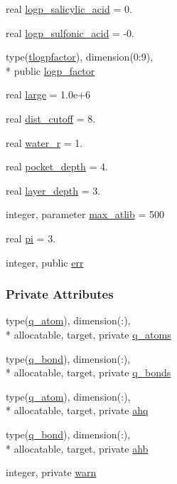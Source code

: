 \begin{DoxyCompactItemize}
\item 
real \hyperlink{classcalc__xscore_a833567713752399cd4b2caeea9efcaf8}{logp\-\_\-salicylic\-\_\-acid} = 0.
\item 
real \hyperlink{classcalc__xscore_a061c7d7389e7c0cf2b5850ab7fc5c934}{logp\-\_\-sulfonic\-\_\-acid} = -\/0.
\item 
type(\hyperlink{structcalc__xscore_1_1tlogpfactor}{tlogpfactor}), dimension(0\-:9), \\*
public \hyperlink{classcalc__xscore_a15e10912826f48cd33ca1d0c8117ce28}{logp\-\_\-factor}
\item 
real \hyperlink{classcalc__xscore_aed23f3f4cf5a66da5996c92f0068b4bd}{large} = 1.\-0e+6
\item 
real \hyperlink{classcalc__xscore_a93430b9e9b8412c72c0c348f44b0ad99}{dist\-\_\-cutoff} = 8.
\item 
real \hyperlink{classcalc__xscore_a73be5046b1f659dd3ef02d0a3a8f1f6a}{water\-\_\-r} = 1.
\item 
real \hyperlink{classcalc__xscore_af609b9596ea420562a73357a122f5469}{pocket\-\_\-depth} = 4.
\item 
real \hyperlink{classcalc__xscore_acf719e7fa91a401a1c8044e68fbf9697}{layer\-\_\-depth} = 3.
\item 
integer, parameter \hyperlink{classcalc__xscore_a91527e259ea15022ad9b4c4621744ad7}{max\-\_\-atlib} = 500
\item 
real \hyperlink{classcalc__xscore_a4fab50dc764bf59bedef759a3a262de1}{pi} = 3.
\item 
integer, public \hyperlink{classcalc__xscore_ab17f107731825ab90d865fb522944051}{err}
\end{DoxyCompactItemize}
\subsubsection*{Private Attributes}
\begin{DoxyCompactItemize}
\item 
type(\hyperlink{structcalc__xscore_1_1q__atom}{q\-\_\-atom}), dimension(\-:), \\*
allocatable, target, private \hyperlink{classcalc__xscore_a7e3421178a8858e85f63d02142911796}{q\-\_\-atoms}
\item 
type(\hyperlink{structcalc__xscore_1_1q__bond}{q\-\_\-bond}), dimension(\-:), \\*
allocatable, target, private \hyperlink{classcalc__xscore_a64b353528653c15ccdf5d5dc6bcfbc9c}{q\-\_\-bonds}
\item 
type(\hyperlink{structcalc__xscore_1_1q__atom}{q\-\_\-atom}), dimension(\-:), \\*
allocatable, target, private \hyperlink{classcalc__xscore_a01f0fee76f9888f7cd8f02133635b474}{ahq}
\item 
type(\hyperlink{structcalc__xscore_1_1q__bond}{q\-\_\-bond}), dimension(\-:), \\*
allocatable, target, private \hyperlink{classcalc__xscore_a82a74fabac5cb2a694cdb95bb55657db}{ahb}
\item 
integer, private \hyperlink{classcalc__xscore_a080458f001c8de380797fa3e13188f70}{warn}
\end{DoxyCompactItemize}


